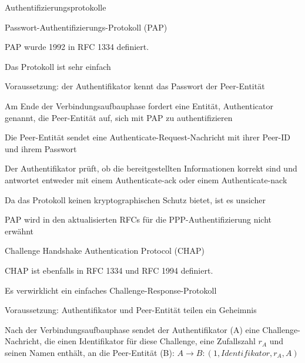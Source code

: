 \documentclass[a4paper]{article}
\begin{document}
\begin{multicols}{3}
      Authentifizierungsprotokolle
      \begin{itemize*}
            \item Passwort-Authentifizierungs-Protokoll (PAP)
            \begin{itemize*}
                  \item PAP wurde 1992 in RFC 1334 definiert.
                  \item Das Protokoll ist sehr einfach
                  \begin{itemize*}
                        \item Voraussetzung: der Authentifikator kennt das Passwort der Peer-Entität
                        \item Am Ende der Verbindungsaufbauphase fordert eine Entität, Authenticator genannt, die Peer-Entität auf, sich mit PAP zu authentifizieren
                        \item Die Peer-Entität sendet eine Authenticate-Request-Nachricht mit ihrer Peer-ID und ihrem Passwort
                        \item Der Authentifikator prüft, ob die bereitgestellten Informationen korrekt sind und antwortet entweder mit einem Authenticate-ack oder einem Authenticate-nack
                  \end{itemize*}
                  \item Da das Protokoll keinen kryptographischen Schutz bietet, ist es unsicher
                  \item PAP wird in den aktualisierten RFCs für die PPP-Authentifizierung nicht erwähnt
            \end{itemize*}
            \item Challenge Handshake Authentication Protocol (CHAP)
            \begin{itemize*}
                  \item CHAP ist ebenfalls in RFC 1334 und RFC 1994 definiert.
                  \item Es verwirklicht ein einfaches Challenge-Response-Protokoll
                  \begin{itemize*}
                        \item Voraussetzung: Authentifikator und Peer-Entität teilen ein Geheimnis
                        \item Nach der Verbindungsaufbauphase sendet der Authentifikator (A) eine Challenge-Nachricht, die einen Identifikator für diese Challenge, eine Zufallszahl $r_A$ und seinen Namen enthält, an die Peer-Entität (B): $A \rightarrow B: (1, Identifikator, r_A, A)$

\end{itemize*}
\end{itemize*}
\end{itemize*}
\end{multicols}
\end{document}
